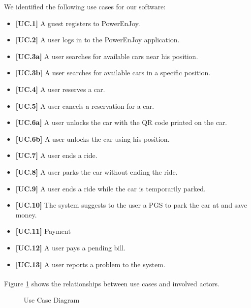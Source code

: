 \documentclass[english]{article}
\begin{document}
We identified the following use cases for our software:
	\begin{itemize}
		\item{\textbf{[UC.1]} A guest registers to PowerEnJoy.}
		\item{\textbf{[UC.2]} A user logs in to the PowerEnJoy application.}
		\item{\textbf{[UC.3a]} A user searches for available cars near his position.}
		\item{\textbf{[UC.3b]} A user searches for available cars in a specific position.}
		\item{\textbf{[UC.4]} A user reserves a car.}
		\item{\textbf{[UC.5]} A user cancels a reservation for a car.}
		\item{\textbf{[UC.6a]} A user unlocks the car with the QR code printed on the car.}
		\item{\textbf{[UC.6b]} A user unlocks the car using his position.}
		\item{\textbf{[UC.7]} A user ends a ride.}
		\item{\textbf{[UC.8]} A user parks the car without ending the ride.}
		\item{\textbf{[UC.9]} A user ends a ride while the car is temporarily parked.}
		\item{\textbf{[UC.10]} The system suggests to the user a PGS to park the car at and save money.}
		\item{\textbf{[UC.11]} Payment}
		\item{\textbf{[UC.12]} A user pays a pending bill.}
		\item{\textbf{[UC.13]} A user reports a problem to the system.}
	\end{itemize}

\paragraph{}
Figure \ref{use_case_diagram} shows the relationships between use cases and involved actors.

	\begin{figure}
		\centering
		\makebox[\textwidth][c]{
			\def\svgwidth{500pt}

			
		}
		\caption{Use Case Diagram}
		\label{use_case_diagram}
	\end{figure}
	\newpage
\end{document}
